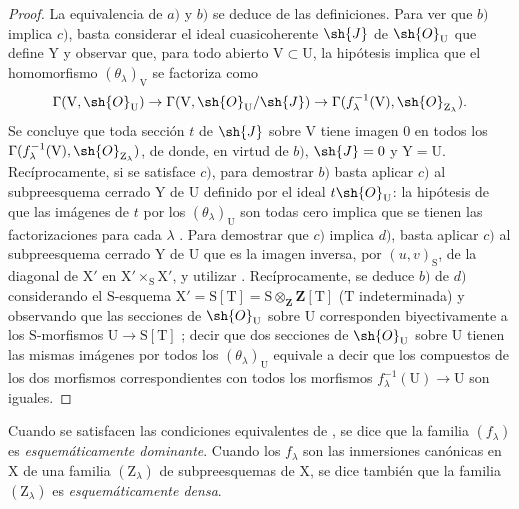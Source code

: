 \begin{proof}
La equivalencia de $a)$ y $b)$ se deduce de las definiciones.
Para ver que $b)$ implica $c)$, basta considerar el ideal cuasicoherente $\sh{J}$ de $\sh{O}_\mathrm{U}$ que define $\mathrm{Y}$ y observar que, para todo abierto $\mathrm{V}\subset\mathrm{U}$, la hipótesis implica que el homomorfismo $(\theta_\lambda)_\mathrm{V}$ se factoriza como
\[
  \Gamma(\mathrm{V},\sh{O}_\mathrm{U})\to\Gamma(\mathrm{V},\sh{O}_\mathrm{U}/\sh{J})\to\Gamma(f_\lambda^{-1}(\mathrm{V}),\sh{O}_{\mathrm{Z}_\lambda}).
\]
Se concluye que toda sección $t$ de $\sh{J}$ sobre $\mathrm{V}$ tiene imagen $0$ en todos los $\Gamma(f_\lambda^{-1}(\mathrm{V}),\sh{O}_{\mathrm{Z}_\lambda})$, de donde, en virtud de $b)$, $\sh{J}=0$ y $\mathrm{Y}=\mathrm{U}$.
Recíprocamente, si se satisface $c)$, para demostrar $b)$ basta aplicar $c)$ al subpreesquema cerrado $\mathrm{Y}$ de $\mathrm{U}$ definido por el ideal $t\sh{O}_\mathrm{U}$: la hipótesis de que las imágenes de $t$ por los $(\theta_\lambda)_\mathrm{U}$ son todas cero implica que se tienen las factorizaciones  para cada $\lambda$ .
Para demostrar que $c)$ implica $d)$, basta aplicar $c)$ al subpreesquema cerrado $\mathrm{Y}$ de $\mathrm{U}$ que es la imagen inversa, por $(u,v)_\mathrm{S}$, de la diagonal de $\mathrm{X}'$ en $\mathrm{X}'\times_\mathrm{S}\mathrm{X}'$, y utilizar .
Recíprocamente, se deduce $b)$ de $d)$ considerando el $\mathrm{S}$-esquema $\mathrm{X}'=\mathrm{S}[\mathrm{T}]=\mathrm{S}\otimes_\mathbf{Z}\mathbf{Z}[\mathrm{T}]$ ($\mathrm{T}$ indeterminada) y observando que las secciones de $\sh{O}_\mathrm{U}$ sobre $\mathrm{U}$ corresponden biyectivamente a los $\mathrm{S}$-morfismos $\mathrm{U}\to\mathrm{S}[\mathrm{T}]$ ; decir que dos secciones de $\sh{O}_\mathrm{U}$ sobre $\mathrm{U}$ tienen las mismas imágenes por todos los $(\theta_\lambda)_\mathrm{U}$ equivale a decir que los compuestos de los dos morfismos correspondientes con todos los morfismos $f_\lambda^{-1}(\mathrm{U})\to\mathrm{U}$ son iguales.
\end{proof}

\begin{definition}[11.10.2]
\label{IV.11.10.2}
Cuando se satisfacen las condiciones equivalentes de , se dice que la familia $(f_\lambda)$ es \emph{esquemáticamente dominante}.
Cuando los $f_\lambda$ son las inmersiones canónicas en $\mathrm{X}$ de una familia $(\mathrm{Z}_\lambda)$ de subpreesquemas de $\mathrm{X}$, se dice también que la familia $(\mathrm{Z}_\lambda)$ es \emph{esquemáticamente densa}.
\end{definition}

